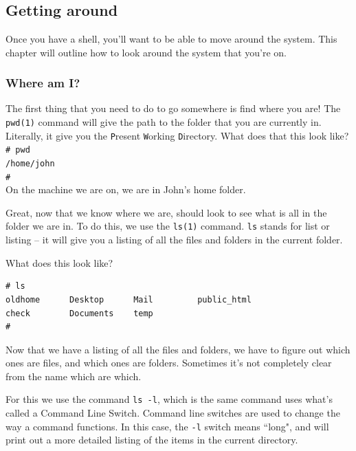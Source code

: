 \chapter[The Shell]{}

\section{Getting around}

Once you have a shell, you'll want to be able to move around the system. 
This chapter will outline how to look around the system that you're on.

\subsection{Where am I?}
The first thing that you need to do to go somewhere is find where you are!  
The {\tt pwd(1)} command will give the path to the folder that you are currently in.  
Literally, it give you the {\tt P}resent {\tt W}orking {\tt D}irectory.   
What does that this look like?
{\\
\tt \# pwd\\
/home/john\\
\#\\
}
On the machine we are on, we are in John's home folder.

Great, now that we know where we are, should look to see what is all in the folder we are in. To do this, we use the {\tt ls(1)} command. {\tt ls} stands for list or listing -- it will give you a listing of all the files and folders in the current folder.

What does this look like?
{\tt \begin{verbatim}
# ls
oldhome      Desktop      Mail         public_html
check        Documents    temp
# 
\end{verbatim}
}

Now that we have a listing of all the files and folders, we have to figure out which ones are files, and which ones are folders.  Sometimes it's not completely clear from the name which are which.

For this we use the command {\tt ls -l}, which is the same command uses what's called a Command Line Switch.  Command line switches are used
to change the way a command functions.  In this case, the {\tt -l} switch means ``long", and will print out a more detailed listing of the items in the current directory.



